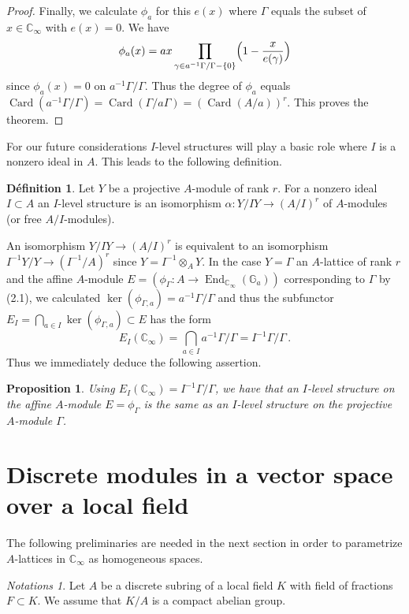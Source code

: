 \documentclass[12pt,a4paper]{article}
\theoremstyle{plain}
\newtheorem{proposition}{Proposition}[section]
\theoremstyle{definition}
\newtheorem{definition}{D\'efinition}[section]
\theoremstyle{remark}
\newtheorem{notations}{Notations}[section]
\DeclareMathOperator{\End}{End}
\DeclareMathOperator{\Card}{Card}
\begin{document}
\begin{proof}
Finally, we calculate $\phi_a$ for this $e(x)$ where $\Gamma$ equals the subset 
of $x \in \mathbb{C}_\infty$ with $e(x) = 0$. We have
\[
\phi_a(x) = ax \prod_{\gamma \in a^{-1}\Gamma/\Gamma - \{0\}} \Bigl(1 - \frac{x}{e(\gamma)}\Bigr)
\]
since $\phi_a(x) = 0$ on $a^{-1}\Gamma/\Gamma$. Thus the degree of $\phi_a$ equals 
$\Card(a^{-1}\Gamma/\Gamma) = \Card(\Gamma/a\Gamma) = (\Card(A/a))^r$. This proves 
the theorem.
\end{proof}

For our future considerations $I$-level structures will play a basic role where 
$I$ is a nonzero ideal in $A$. This leads to the following definition.

\begin{definition}
Let $Y$ be a projective $A$-module of rank $r$. For a nonzero ideal 
$I \subset A$ an $I$-level structure is an isomorphism 
$\alpha\colon Y/IY \to (A/I)^r$ of $A$-modules (or free $A/I$-modules).
\end{definition}

An isomorphism $Y/IY \to (A/I)^r$ is equivalent to an isomorphism 
$I^{-1}Y/Y \to (I^{-1}/A)^r$ since $Y = I^{-1} \otimes_A Y$. In the case 
$Y = \Gamma$ an $A$-lattice of rank $r$ and the affine $A$-module 
$E = (\phi_\Gamma\colon A \to \End_{\mathbb{C}_\infty}(\mathbb{G}_a))$ corresponding 
to $\Gamma$ by (2.1), we calculated $\ker(\phi_{\Gamma,a}) = a^{-1}\Gamma/\Gamma$ 
and thus the subfunctor $E_I = \bigcap_{a \in I} \ker(\phi_{\Gamma,a}) \subset E$ 
has the form
\[
E_I(\mathbb{C}_\infty) = \bigcap_{a \in I} a^{-1}\Gamma/\Gamma = I^{-1}\Gamma/\Gamma \,.
\]
Thus we immediately deduce the following assertion.

\begin{proposition}
Using $E_I(\mathbb{C}_\infty) = I^{-1}\Gamma/\Gamma$, we have that an $I$-level 
structure on the affine $A$-module $E = \phi_\Gamma$ is the same as an $I$-level 
structure on the projective $A$-module $\Gamma$.
\end{proposition}


\section{Discrete modules in a vector space over a local field}

The following preliminaries are needed in the next section in order to 
parametrize $A$-lattices in $\mathbb{C}_\infty$ as homogeneous spaces.

\begin{notations}
Let $A$ be a discrete subring of a local field $K$ with field of fractions 
$F \subset K$. We assume that $K/A$ is a compact abelian group.
\end{notations}
\end{document}
